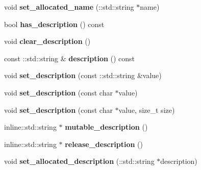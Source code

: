 \begin{DoxyCompactItemize}
\item 
\hypertarget{class_person_a90500968607a92bbe3ccb103f63decd4}{}void {\bfseries set\+\_\+allocated\+\_\+name} (\+::std\+::string $\ast$name)\label{class_person_a90500968607a92bbe3ccb103f63decd4}

\item 
\hypertarget{class_person_a6451439d9448b1f2b65a438b5763467b}{}bool {\bfseries has\+\_\+description} () const \label{class_person_a6451439d9448b1f2b65a438b5763467b}

\item 
\hypertarget{class_person_a4007a1890a455caee89845375474c2d2}{}void {\bfseries clear\+\_\+description} ()\label{class_person_a4007a1890a455caee89845375474c2d2}

\item 
\hypertarget{class_person_a2cb75b520ef2857097f6806d0674c1dd}{}const \+::std\+::string \& {\bfseries description} () const \label{class_person_a2cb75b520ef2857097f6806d0674c1dd}

\item 
\hypertarget{class_person_a358c7df9311a9fdc04450174db706d41}{}void {\bfseries set\+\_\+description} (const \+::std\+::string \&value)\label{class_person_a358c7df9311a9fdc04450174db706d41}

\item 
\hypertarget{class_person_a4de036bf43367a527c83ea0d9fe8f010}{}void {\bfseries set\+\_\+description} (const char $\ast$value)\label{class_person_a4de036bf43367a527c83ea0d9fe8f010}

\item 
\hypertarget{class_person_a1ba0aa3314f34ac4c30728f78f133e17}{}void {\bfseries set\+\_\+description} (const char $\ast$value, size\+\_\+t size)\label{class_person_a1ba0aa3314f34ac4c30728f78f133e17}

\item 
\hypertarget{class_person_ae4bae214d1cad0d61697c9ec1a260431}{}inline\+::std\+::string $\ast$ {\bfseries mutable\+\_\+description} ()\label{class_person_ae4bae214d1cad0d61697c9ec1a260431}

\item 
\hypertarget{class_person_ab56fa0cc694d8886d65096ccea032880}{}inline\+::std\+::string $\ast$ {\bfseries release\+\_\+description} ()\label{class_person_ab56fa0cc694d8886d65096ccea032880}

\item 
\hypertarget{class_person_ab65ac13a60175242a3d020889ad6c14e}{}void {\bfseries set\+\_\+allocated\+\_\+description} (\+::std\+::string $\ast$description)\label{class_person_ab65ac13a60175242a3d020889ad6c14e}

\end{DoxyCompactItemize}

